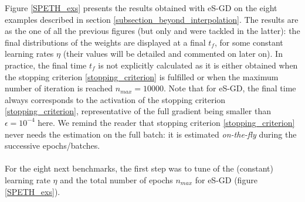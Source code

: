 \documentclass[article,authoryear,jmlmc]{beg_32}             %
\begin{document}
Figure \ref{SPETH_exs} presents the results obtained with eS-GD on the eight examples described in section \ref{subsection_beyond_interpolation}. 
The results are  as the one of all the previous figures (but only \exOne and \exTwo were tackled in the latter): the final distributions of the weights are
displayed at a final $t_f$, for some constant learning rates $\eta$ (their values will be detailed and commented on later on).  
In practice, the final time $t_f$ is not explicitly calculated as it is either obtained when the stopping criterion \eqref{stopping_criterion} is fulfilled or when the maximum number of iteration is reached
$n_{max} = 10000$.  
Note that for eS-GD, the final time always corresponds to the activation of the stopping criterion \eqref{stopping_criterion}, representative of the full gradient being smaller than $\epsilon =
10^{-4}$ here. We remind the reader that stopping criterion \eqref{stopping_criterion} never needs the estimation on the full batch: it is estimated {\em on-the-fly} during the successive
epochs/batches.  
\ \\ \ \\
For the eight next benchmarks, the first step was to tune of the (constant) learning rate $\eta$ and the total number of epochs $n_{max}$ for eS-GD (figure \ref{SPETH_exs}). 
\end{document}
